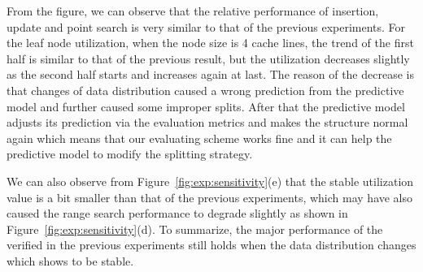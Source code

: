 From the figure, we can observe that the relative performance of
insertion, update and point search is very similar to that of the
previous experiments. For the leaf node utilization, when the node
size is 4 cache lines, the trend of the first half is similar to
that of the previous result, but the utilization decreases slightly
as the second half starts and increases again at last. The
reason of the decrease is that changes of data distribution caused
a wrong prediction from the predictive model and further caused
some improper splits. After that the predictive model adjusts its
prediction via the evaluation metrics and makes the structure
normal again which means that our evaluating scheme works fine 
and it can help the predictive model to modify the splitting strategy. 


We can also observe from Figure~\ref{fig:exp:sensitivity}(e) that
the stable utilization value is a bit smaller than that of the
previous experiments, which may have also caused the range search
performance to degrade slightly as shown in
Figure~\ref{fig:exp:sensitivity}(d). To summarize, the major
performance of the \bptree verified in the previous experiments
still holds when the data distribution changes which shows \bptree to be stable.

